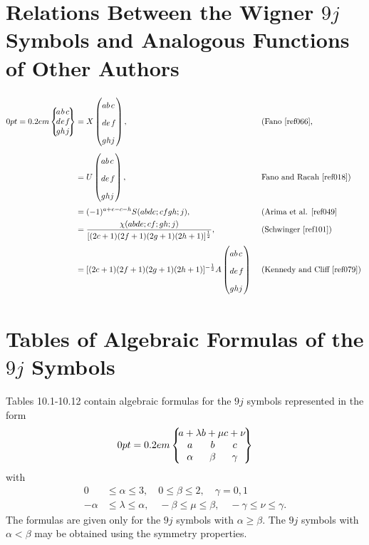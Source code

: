 \section{Relations Between the Wigner $9 j$ Symbols and Analogous Functions of Other Authors}\label{sec:10.10}
\[
\begin{aligned}
\ninej{a}{b}{c}{d}{e}{f}{g}{h}{j} & =X\left(\begin{array}{lll}
a & b & c \\
d & e & f \\
g & h & j
\end{array}\right), & & \text { (Fano \cite{ref066}, } \\
& =U\left(\begin{array}{lll}
a & b & c \\
d & e & f \\
g & h & j
\end{array}\right), & & \text { Fano and Racah \cite{ref018}) } \\
& =(-1)^{a+e-c-h} S(a b d e ; c f g h ; j), & & \text { (Arima et al. \cite{ref049} } \\
& =\frac{\chi(a b d e ; c f ; g h ; j)}{[(2 c+1)(2 f+1)(2 g+1)(2 h+1)]^{\frac{1}{2}}}, & & \text { (Schwinger \cite{ref101}) } \\
& =[(2 c+1)(2 f+1)(2 g+1)(2 h+1)]^{-\frac{1}{2}} A\left(\begin{array}{lll}
a & b & c \\
d & e & f \\
g & h & j
\end{array}\right) & & \text { (Kennedy and Cliff \cite{ref079}) }
\end{aligned}
\]
\section{Tables of Algebraic Formulas of the $9 j$ Symbols}\label{sec:10.11}
Tables 10.1-10.12 contain algebraic formulas for the $9 j$ symbols represented in the form
\[
\ninej{a+\lambda}{b+\mu}{c+\nu}{a}{b}{c}{\alpha}{\beta}{\gamma}
\]
with
\[
\begin{array}{rrrl}
0 & \leq \alpha \leq 3, \quad 0 \leq \beta \leq 2, \quad \gamma=0,1 \\
-\alpha & \leq \lambda \leq \alpha, \quad-\beta \leq \mu \leq \beta, \quad-\gamma \leq \nu \leq \gamma .
\end{array}
\]
The formulas are given only for the $9 j$ symbols with $\alpha \geq \beta$. The $9 j$ symbols with $\alpha<\beta$ may be obtained using the symmetry properties.

